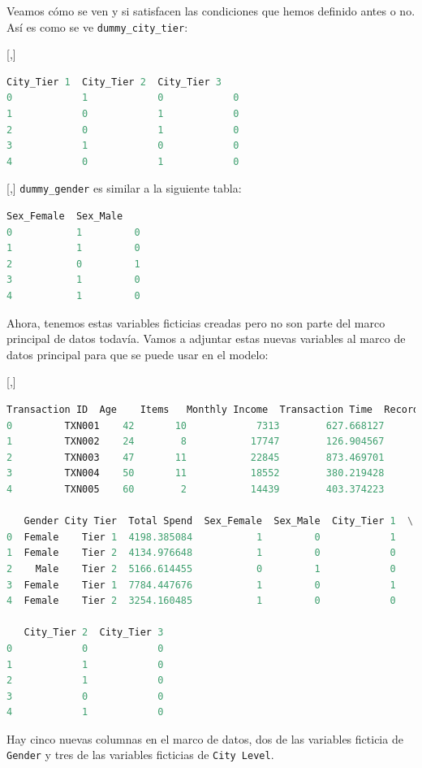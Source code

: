 Veamos cómo se ven y si satisfacen las condiciones que hemos definido
antes o no. Así es como se ve \texttt{dummy\_city\_tier}:

[,]{}
\begin{lstlisting}[language=Python]
   City_Tier 1  City_Tier 2  City_Tier 3
0            1            0            0
1            0            1            0
2            0            1            0
3            1            0            0
4            0            1            0
\end{lstlisting}

[,]{}
\texttt{dummy\_gender} es similar a la siguiente tabla:
\begin{lstlisting}[language=Python]
   Sex_Female  Sex_Male
0           1         0
1           1         0
2           0         1
3           1         0
4           1         0
\end{lstlisting}


Ahora, tenemos estas variables ficticias creadas pero no son parte del
marco principal de datos todavía. Vamos a adjuntar estas nuevas variables al marco de datos principal para que
se puede usar en el modelo:

[,]{}
\tiny
\begin{lstlisting}[language=Python]
  Transaction ID  Age    Items   Monthly Income  Transaction Time  Record  \
0         TXN001    42       10            7313        627.668127       5
1         TXN002    24        8           17747        126.904567       3
2         TXN003    47       11           22845        873.469701       2
3         TXN004    50       11           18552        380.219428       7
4         TXN005    60        2           14439        403.374223       2

   Gender City Tier  Total Spend  Sex_Female  Sex_Male  City_Tier 1  \
0  Female    Tier 1  4198.385084           1         0            1
1  Female    Tier 2  4134.976648           1         0            0
2    Male    Tier 2  5166.614455           0         1            0
3  Female    Tier 1  7784.447676           1         0            1
4  Female    Tier 2  3254.160485           1         0            0

   City_Tier 2  City_Tier 3
0            0            0
1            1            0
2            1            0
3            0            0
4            1            0
\end{lstlisting}


Hay cinco nuevas columnas en el marco de datos, dos de las variables ficticia de \texttt{Gender} y tres de las variables ficticias de \texttt{City Level}.


